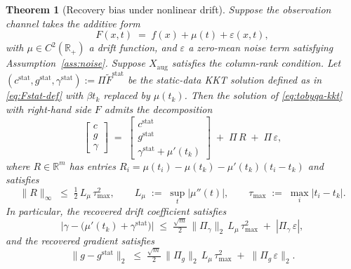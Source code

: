 \documentclass[11pt,a4paper]{article}
\newcommand{\R}{\mathbb{R}}
\newtheorem{theorem}{Theorem}[section]
\begin{document}
\begin{theorem}[Recovery bias under nonlinear drift]
\label{thm:nonlinear-drift}
Suppose the observation channel takes the additive form
\begin{equation}\label{eq:additive-nonlinear}
  F(x, t) \;=\; f(x) + \mu(t) + \varepsilon(x, t),
\end{equation}
with $\mu \in C^2(\R_+)$ a drift function, and $\varepsilon$ a
zero-mean noise term satisfying Assumption~\ref{ass:noise}.
Suppose $X_{\mathrm{aug}}$ satisfies the column-rank condition.
Let
$(c^{\mathrm{stat}}, g^{\mathrm{stat}}, \gamma^{\mathrm{stat}})
:= \Pi \tilde F^{\mathrm{stat}}$
be the static-data KKT solution defined as in
\eqref{eq:Fstat-def} with $\beta t_k$ replaced by $\mu(t_k)$.
Then the solution of \eqref{eq:tobyqa-kkt} with right-hand side
$F$ admits the decomposition
\begin{equation}\label{eq:nonlinear-decomp}
  \begin{bmatrix} c \\ g \\ \gamma \end{bmatrix}
  \;=\;
  \begin{bmatrix}
    c^{\mathrm{stat}} \\
    g^{\mathrm{stat}} \\
    \gamma^{\mathrm{stat}} + \mu'(t_k)
  \end{bmatrix}
  \;+\; \Pi\,R \;+\; \Pi\,\varepsilon,
\end{equation}
where $R \in \R^m$ has entries
$R_i = \mu(t_i) - \mu(t_k) - \mu'(t_k)(t_i - t_k)$
and satisfies
\begin{equation}\label{eq:R-bound}
  \|R\|_\infty \;\le\; \tfrac{1}{2}\,L_\mu\,\tau_{\max}^2,
  \qquad
  L_\mu \;:=\; \sup_t |\mu''(t)|,
  \qquad
  \tau_{\max} \;:=\; \max_i |t_i - t_k|.
\end{equation}
In particular, the recovered drift coefficient satisfies
\begin{equation}\label{eq:gamma-bias-bound}
  \bigl|\gamma - \bigl(\mu'(t_k) + \gamma^{\mathrm{stat}}\bigr)\bigr|
  \;\le\; \tfrac{\sqrt{m}}{2}\,
          \|\Pi_\gamma\|_2\,L_\mu\,\tau_{\max}^2
          \;+\; |\Pi_\gamma\,\varepsilon|,
\end{equation}
and the recovered gradient satisfies
\begin{equation}\label{eq:g-bias-bound}
  \|g - g^{\mathrm{stat}}\|_2
  \;\le\; \tfrac{\sqrt{m}}{2}\,
          \|\Pi_g\|_2\,L_\mu\,\tau_{\max}^2
          \;+\; \|\Pi_g\,\varepsilon\|_2.
\end{equation}
\end{theorem}
\end{document}
